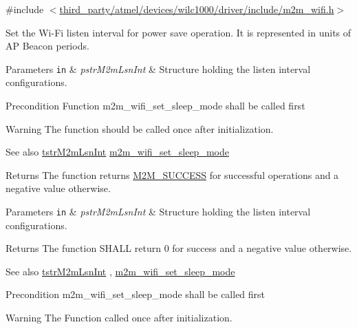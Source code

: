 {\ttfamily \#include $<$\hyperlink{m2m__wifi_8h}{third\+\_\+party/atmel/devices/wilc1000/driver/include/m2m\+\_\+wifi.\+h}$>$}



Set the Wi-\/\+Fi listen interval for power save operation. It is represented in units of AP Beacon periods. 


\begin{DoxyParams}[1]{Parameters}
\mbox{\tt in}  & {\em pstr\+M2m\+Lsn\+Int} & Structure holding the listen interval configurations. \\
\hline
\end{DoxyParams}
\begin{DoxyPrecond}{Precondition}
Function m2m\+\_\+wifi\+\_\+set\+\_\+sleep\+\_\+mode shall be called first 
\end{DoxyPrecond}
\begin{DoxyWarning}{Warning}
The function should be called once after initialization. 
\end{DoxyWarning}
\begin{DoxySeeAlso}{See also}
\hyperlink{structtstrM2mLsnInt}{tstr\+M2m\+Lsn\+Int} \hyperlink{group__SetSleepModeFn_gaeea00cc2149c37ac91e2cb5882dadd14}{m2m\+\_\+wifi\+\_\+set\+\_\+sleep\+\_\+mode} 
\end{DoxySeeAlso}
\begin{DoxyReturn}{Returns}
The function returns \hyperlink{nm__common_8h_a9ef27ba27aafdd1aa3a79d3ba2c36b8f}{M2\+M\+\_\+\+S\+U\+C\+C\+E\+SS} for successful operations and a negative value otherwise.
\end{DoxyReturn}

\begin{DoxyParams}[1]{Parameters}
\mbox{\tt in}  & {\em pstr\+M2m\+Lsn\+Int} & Structure holding the listen interval configurations. \\
\hline
\end{DoxyParams}
\begin{DoxyReturn}{Returns}
The function S\+H\+A\+LL return 0 for success and a negative value otherwise. 
\end{DoxyReturn}
\begin{DoxySeeAlso}{See also}
\hyperlink{structtstrM2mLsnInt}{tstr\+M2m\+Lsn\+Int} , \hyperlink{group__SetSleepModeFn_gaeea00cc2149c37ac91e2cb5882dadd14}{m2m\+\_\+wifi\+\_\+set\+\_\+sleep\+\_\+mode} 
\end{DoxySeeAlso}
\begin{DoxyPrecond}{Precondition}
m2m\+\_\+wifi\+\_\+set\+\_\+sleep\+\_\+mode shall be called first 
\end{DoxyPrecond}
\begin{DoxyWarning}{Warning}
The Function called once after initialization. 
\end{DoxyWarning}


